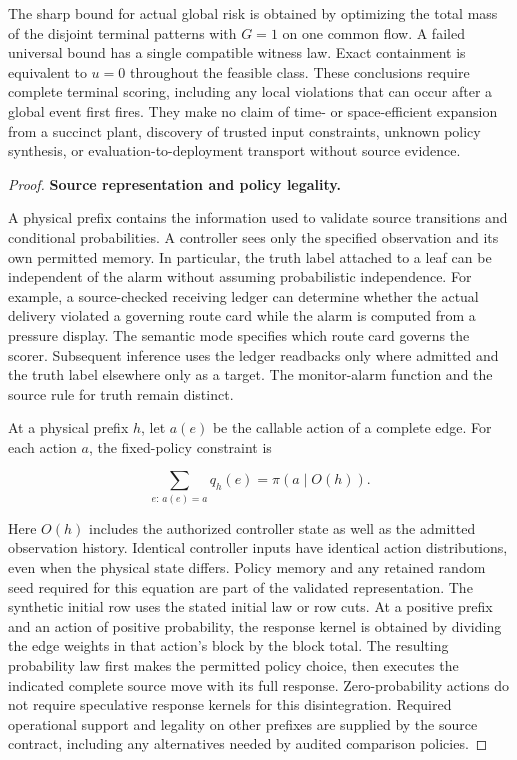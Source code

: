 \begin{theorem}
The sharp bound for actual global risk is obtained by optimizing the total mass of the disjoint terminal patterns with \(G=1\) on one common flow. A failed universal bound has a single compatible witness law. Exact containment is equivalent to \(u=0\) throughout the feasible class. These conclusions require complete terminal scoring, including any local violations that can occur after a global event first fires. They make no claim of time- or space-efficient expansion from a succinct plant, discovery of trusted input constraints, unknown policy synthesis, or evaluation-to-deployment transport without source evidence.

\end{theorem}

\begin{proof}



\textbf{Source representation and policy legality.}

A physical prefix contains the information used to validate source transitions and conditional probabilities. A controller sees only the specified observation and its own permitted memory. In particular, the truth label attached to a leaf can be independent of the alarm without assuming probabilistic independence. For example, a source-checked receiving ledger can determine whether the actual delivery violated a governing route card while the alarm is computed from a pressure display. The semantic mode specifies which route card governs the scorer. Subsequent inference uses the ledger readbacks only where admitted and the truth label elsewhere only as a target. The monitor-alarm function and the source rule for truth remain distinct.

At a physical prefix \(h\), let \(a(e)\) be the callable action of a complete edge. For each action \(a\), the fixed-policy constraint is

\[
\sum_{e:\,a(e)=a}q_h(e)=\pi(a\mid O(h)).
\]

Here \(O(h)\) includes the authorized controller state as well as the admitted observation history. Identical controller inputs have identical action distributions, even when the physical state differs. Policy memory and any retained random seed required for this equation are part of the validated representation. The synthetic initial row uses the stated initial law or row cuts. At a positive prefix and an action of positive probability, the response kernel is obtained by dividing the edge weights in that action's block by the block total. The resulting probability law first makes the permitted policy choice, then executes the indicated complete source move with its full response. Zero-probability actions do not require speculative response kernels for this disintegration. Required operational support and legality on other prefixes are supplied by the source contract, including any alternatives needed by audited comparison policies.


\end{proof}
